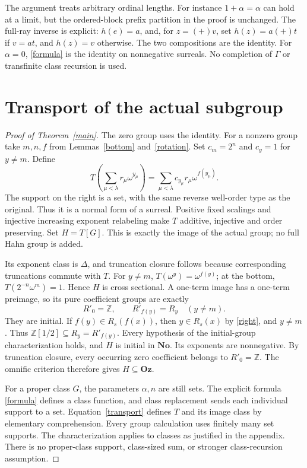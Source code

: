\documentclass[11pt]{article}
\newcommand{\No}{\mathbf{No}}
\newcommand{\Oz}{\mathbf{Oz}}
\newcommand{\D}{\mathbb{Z}[1/2]}
\newcommand{\Z}{\mathbb{Z}}
\begin{document}
The argument treats arbitrary ordinal lengths. For instance
$1+\alpha=\alpha$ can hold at a limit, but the ordered-block prefix
partition in the proof is unchanged. The full-ray inverse is explicit:
$h(e)=a$, and, for $z=(+)v$, set $h(z)=a(+)t$ if $v=at$,
and $h(z)=v$ otherwise. The two compositions are the identity.
For $\alpha=0$, \eqref{formula} is the identity on nonnegative surreals.
No completion of $\Gamma$ or transfinite class recursion is used.

\section{Transport of the actual subgroup}
\begin{proof}[Proof of Theorem~\ref{main}]
The zero group uses the identity. For a nonzero group take $m,n,f$ from
Lemmas~\ref{bottom} and~\ref{rotation}. Set $c_m=2^n$ and $c_y=1$ for $y\ne m$.
Define
\begin{equation}\label{transport}
 T\left(\sum_{\mu<\lambda}r_\mu\omega^{y_\mu}\right)
    =\sum_{\mu<\lambda}c_{y_\mu}r_\mu\omega^{f(y_\mu)}.
\end{equation}
The support on the right is a set, with the same reverse well-order type
as the original. Thus it is a normal form of a surreal.
Positive fixed scalings and injective increasing exponent relabeling make
$T$ additive, injective and order preserving. Set $H=T[G]$.
This is exactly the image of the actual group; no full Hahn group is added.

Its exponent class is $\Delta$, and truncation closure follows because
corresponding truncations commute with $T$.
For $y\ne m$, $T(\omega^y)=\omega^{f(y)}$; at the bottom,
$T(2^{-n}\omega^m)=1$. Hence $H$ is cross sectional.
A one-term image has a one-term preimage, so its pure coefficient groups
are exactly
\begin{equation}\label{coeff}
 R'_0=\Z,\qquad R'_{f(y)}=R_y\quad(y\ne m).
\end{equation}
They are initial. If $f(y)\in R_s(f(x))$, then $y\in R_s(x)$ by
\eqref{right}, and $y\ne m$. Thus $\D\subseteq R_y=R'_{f(y)}$.
Every hypothesis of the initial-group characterization holds, and $H$
is initial in $\No$. Its exponents are nonnegative. By truncation
closure, every occurring zero coefficient belongs to $R'_0=\Z$.
The omnific criterion therefore gives $H\subseteq\Oz$.

For a proper class $G$, the parameters $\alpha,n$ are still sets.
The explicit formula \eqref{formula} defines a class function, and
class replacement sends each individual support to a set.
Equation~\eqref{transport} defines $T$ and its image class by elementary
comprehension. Every group calculation uses finitely many set supports.
The characterization applies to classes as justified in the appendix.
There is no proper-class support, class-sized sum, or stronger
class-recursion assumption.
\end{proof}
\end{document}
